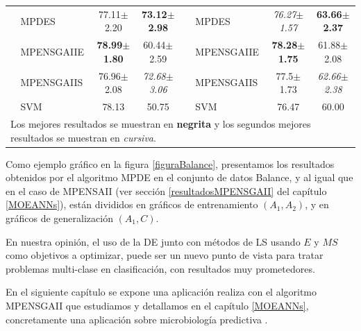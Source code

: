 \begin{table}[!htb]
\begin{tabular}{llccllcc}
\rowcolor[rgb]{0.86,0.94,1}& MPDES & 77.11$\pm$2.20\textbf{\textit{}} &
\textbf{73.12$\pm$2.98} &  & MPDES & \textit{76.27$\pm$1.57} & \textbf{63.66$\pm$2.37} \\
\rowcolor[rgb]{0.86,0.94,1}& MPENSGAIIE & \textbf{78.99$\pm$1.80} & 60.44$\pm$2.59 &  &
MPENSGAIIE & \textbf{78.28$\pm$1.75}\textit{} & 61.88$\pm$2.08\textit{} \\
\rowcolor[rgb]{0.86,0.94,1}\textbf{} & MPENSGAIIS & 76.96$\pm$2.08 &
\textit{72.68$\pm$3.06} &  & MPENSGAIIS & 77.5$\pm$1.73 & \textit{62.66$\pm$2.38}\textbf{}
\\
\rowcolor[rgb]{0.86,0.94,1} & SVM & 78.13 & 50.75 &  & SVM & 76.47 & 60.00 \\ \hline
\multicolumn{8}{l}{Los mejores resultados se muestran en \textbf{negrita} y los segundos
mejores resultados se muestran en \textit{cursiva}.}\\
\end{tabular}
\end{table}

Como ejemplo gráfico en la figura \ref{figuraBalance}, presentamos los resultados obtenidos por
el algoritmo MPDE en el conjunto de datos Balance, y al igual que en el caso de MPENSAII (ver
sección \ref{resultadosMPENSGAII} del capítulo \ref{MOEANNs}), están divididos en gráficos de
entrenamiento $(A_{1},A_{2})$, y en gráficos de generalización $(A_{1},C)$.

En nuestra opinión, el uso de la DE junto con métodos de LS usando $E$ y $MS$ como
objetivos
a optimizar, puede ser un nuevo punto de vista para tratar problemas multi-clase en clasificación,
con resultados muy prometedores.

En el siguiente capítulo se expone una aplicación realiza con el algoritmo MPENSGAII que
estudiamos y detallamos en el capítulo \ref{MOEANNs}, concretamente una aplicación sobre
microbiología predictiva \cite{Valero2009}.

